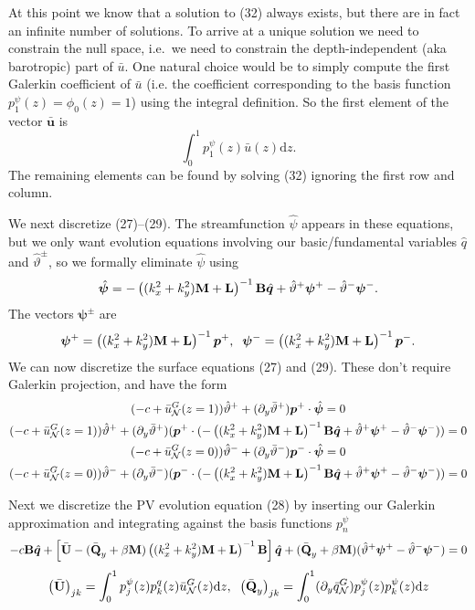 \documentclass[10pt]{article}
\newcommand{\pd}[1]{\partial_{#1}}
\newcommand{\sN}{\mathcal{N}}
\newcommand{\mat}[1]{\text{\bf #1}}
\begin{document}
At this point we know that a solution to (32) always exists, but there are in fact an infinite number of solutions.
To arrive at a unique solution we need to constrain the null space, i.e.~we need to constrain the depth-independent (aka barotropic) part of $\bar u$.
One natural choice would be to simply compute the first Galerkin coefficient of $\bar u$ (i.e. the coefficient corresponding to the basis function $p_1^\psi(z) = \phi_0(z) = 1$) using the integral definition.
So the first element of the vector $\bar{\bm{u}}$ is 
\[\int_0^1p_1^\psi(z)\bar{u}(z)\text{d}z.\]
The remaining elements can be found by solving (32) ignoring the first row and column.

We next discretize (27)--(29).
The streamfunction $\hat{\psi}$ appears in these equations, but we only want evolution equations involving our basic/fundamental variables $\hat{q}$ and $\hat{\vartheta}^\pm$, so we formally eliminate $\hat{\psi}$ using
\[\hat{\bm{\psi}} = -\left((k_x^2+k_y^2)\mat{M}+\mat{L}\right)^{-1}\mat{B}\hat{\bm{q}} +\hat{\vartheta}^+\bm{\psi}^+-\hat{\vartheta}^-\bm{\psi}^-.\]
The vectors $\bm{\psi}^\pm$ are
\[\bm{\psi}^+ = \left((k_x^2+k_y^2)\mat{M}+\mat{L}\right)^{-1}\bm{p}^+,\;\;\bm{\psi}^- = \left((k_x^2+k_y^2)\mat{M}+\mat{L}\right)^{-1}\bm{p}^-.\]
We can now discretize the surface equations (27) and (29).
These don't require Galerkin projection, and have the form
\begin{gather}\notag
(-c+\bar u_\sN^G(z=1))\hat{\vartheta}^+ + (\pd{y}\bar\vartheta^+)\bm{p}^+\cdot\hat{\bm{\psi}}=0\\
(-c+\bar u_\sN^G(z=1))\hat{\vartheta}^+ + (\pd{y}\bar\vartheta^+)(\bm{p}^+\cdot(-\left((k_x^2+k_y^2)\mat{M}+\mat{L}\right)^{-1}\mat{B}\hat{\bm{q}} +\hat{\vartheta}^+\bm{\psi}^+-\hat{\vartheta}^-\bm{\psi}^-))=0\\\notag
(-c+\bar u_\sN^G(z=0))\hat{\vartheta}^- + (\pd{y}\bar\vartheta^-)\bm{p}^-\cdot\hat{\bm{\psi}}=0\\
(-c+\bar u_\sN^G(z=0))\hat{\vartheta}^- + (\pd{y}\bar\vartheta^-)(\bm{p}^-\cdot(-\left((k_x^2+k_y^2)\mat{M}+\mat{L}\right)^{-1}\mat{B}\hat{\bm{q}} +\hat{\vartheta}^+\bm{\psi}^+-\hat{\vartheta}^-\bm{\psi}^-))=0
\end{gather}

Next we discretize the PV evolution equation (28) by inserting our Galerkin approximation and integrating against the basis functions $p_n^\psi$
\begin{gather}
-c\mat{B}\hat{\bm{q}} +\left[\bar{\mat{U}} -(\bar{\mat{Q}}_y+\beta\mat{M})\left((k_x^2+k_y^2)\mat{M}+\mat{L}\right)^{-1} \mat{B}\right]\hat{\bm{q}} + (\bar{\mat{Q}}_y+\beta\mat{M})(\hat{\vartheta}^+\bm{\psi}^+-\hat{\vartheta}^-\bm{\psi}^-) = 0
\end{gather}
\[\left(\bar{\mat{U}}\right)_{jk} = \int_0^1 p_j^\psi(z)p_k^q(z)\bar{u}_\sN^G(z)\text{d}z,\;\;\left(\bar{\mat{Q}}_y\right)_{jk} = \int_0^1(\pd{y}\bar q_\sN^G)p_j^\psi(z)p_k^\psi(z)\text{d}z\]
\end{document}

